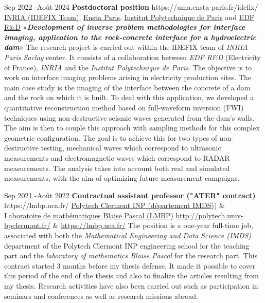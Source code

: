 \documentclass[10pt]{article} %
\begin{document}
\job
{Sep 2022 -}{Août 2024}
{\textbf{Postdoctoral position}}
{https://uma.ensta-paris.fr/idefix/}
{\href{https://uma.ensta-paris.fr/idefix/}{INRIA (IDEFIX Team)}, \href{https://www.ensta-paris.fr/}{Ensta Paris},  \href{https://www.ip-paris.fr/}{Institut Polytechnique de Paris} and \href{https://www.edf.fr/groupe-edf/inventer-l-avenir-de-l-energie/r-d-un-savoir-faire-mondial/5-ans-edf-lab-saclay/edf-lab-chatou-75-ans-de-recherche }{EDF R\&D}}
{«\textbf{\textit{Development of inverse problem methodologies for interface imaging, application to the rock-concrete interface for a hydroelectric dam}}»}
{The research project is carried out within the IDEFIX team of \textit{INRIA Paris Saclay} center. It consists of a collaboration between \textit{EDF  R\&D} (Electricity of France), \textit{INRIA} and the \textit{Institut Polytechnique de Paris}. The objective is to work on interface imaging problems arising in electricity production sites.
The main case study is the imaging of the interface between the concrete of a dam and the rock on which it is built. To deal with this application, we developed a quantitative reconstruction method based on  full-waveform inversion (FWI) techniques using non-destructive seismic waves generated from the dam's walls. The aim is then to couple this approach with sampling methods for this complex geometric configuration. The goal is to achieve this for two types of non-destructive testing, mechanical waves which correspond to ultrasonic measurements and electromagnetic waves which correspond to RADAR measurements. The analysis takes into account both real and simulated measurements, with the aim of optimizing future measurement campaigns.
}

\job
{Sep 2021 -}{Août 2022}
{\textbf{Contractual assistant professor ("ATER" contract)}}
{https://lmbp.uca.fr/}
{\href{http://polytech.univ-bpclermont.fr/}{Polytech Clermont INP (département IMDS)}) \&   \href{https://lmbp.uca.fr/}{Laboratoire de mathématiques Blaise Pascal  (LMBP)}}
{\href{http://polytech.univ-bpclermont.fr/}{http://polytech.univ-bpclermont.fr/}     \&   \href{https://lmbp.uca.fr/}{https://lmbp.uca.fr/}  }
{ The position is a one-year full-time job,  associated with both the \textit{Mathematical Engineering and Data Science (IMDS)} department of the Polytech Clermont INP engineering school for the teaching part and the \textit{laboratory of mathematics Blaise Pascal}  for the research part.
	This contract started 3 months before my thesis defense. It made it possible to cover this period of the end of the thesis and also to finalize the articles resulting from my thesis. Research activities have also been carried out such as participation in seminars and conferences as well as research missions abroad.
	}
\end{document}
